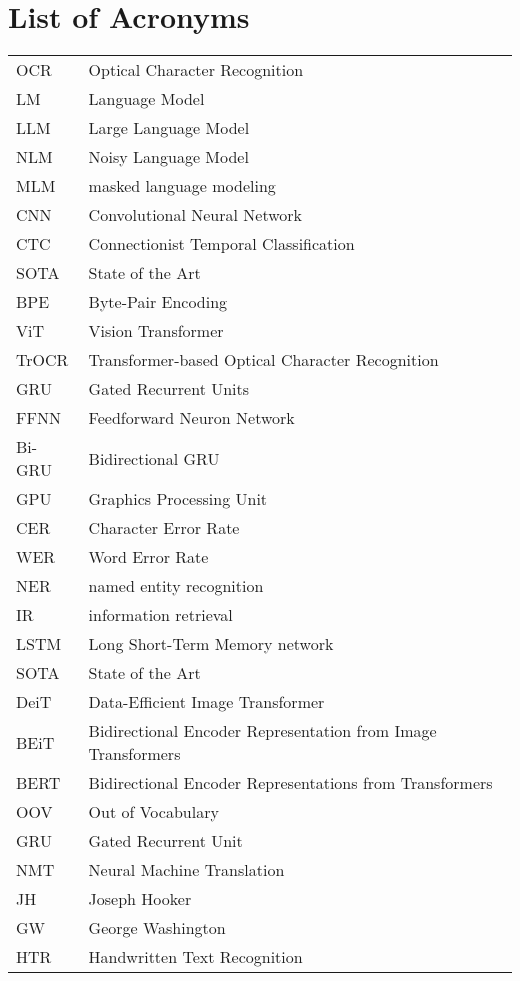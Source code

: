 {}
\chapter*{List of Acronyms}

\begin{supertabular}{lp{12.5cm}}
OCR & Optical Character Recognition\\
LM & Language Model\\
LLM & Large Language Model\\
NLM & Noisy Language Model\\
MLM & masked language modeling\\
CNN & Convolutional Neural Network\\
CTC & Connectionist Temporal Classification\\
SOTA & State of the Art\\
BPE & Byte-Pair Encoding\\
ViT & Vision Transformer\\
TrOCR & Transformer-based Optical Character Recognition\\
GRU & Gated Recurrent Units\\
FFNN & Feedforward Neuron Network\\
Bi-GRU & Bidirectional GRU\\
GPU & Graphics Processing Unit\\
CER & Character Error Rate\\
WER & Word Error Rate\\
NER & named entity recognition\\
IR & information retrieval\\
LSTM & Long Short-Term Memory network\\
SOTA & State of the Art\\
DeiT & Data-Efficient Image Transformer\\
BEiT & Bidirectional Encoder Representation from Image Transformers\\
BERT & Bidirectional Encoder Representations from Transformers\\
OOV & Out of Vocabulary\\
GRU & Gated Recurrent Unit\\
NMT & Neural Machine Translation\\
JH & Joseph Hooker\\
GW & George Washington\\
HTR & Handwritten Text Recognition\\
\end{supertabular}

\newpage